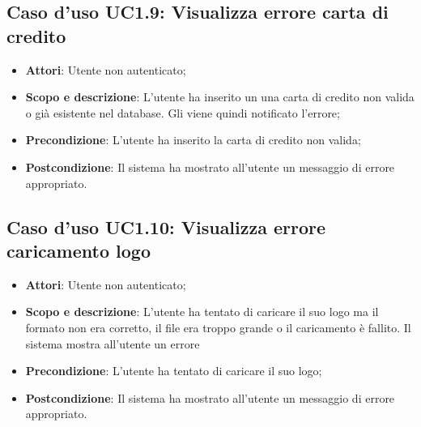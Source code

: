 \documentclass[12pt,a4paper,titlepage]{article}
\begin{document}
	\subsection{Caso d'uso UC1.9: Visualizza errore carta di credito}
	\label{UC1.9}
	\begin{itemize}
		\item \textbf{Attori}: Utente non autenticato;
		\item \textbf{Scopo e descrizione}: L'utente ha inserito un una carta di credito non valida o già esistente nel database. Gli viene quindi notificato l'errore;
		\item \textbf{Precondizione}: L'utente ha inserito la carta di credito non valida;
		\item \textbf{Postcondizione}: Il sistema ha mostrato all'utente un messaggio di errore appropriato.
	\end{itemize}

	\subsection{Caso d'uso UC1.10: Visualizza errore caricamento logo}
	\label{UC1.10}
	\begin{itemize}
		\item \textbf{Attori}: Utente non autenticato;
		\item \textbf{Scopo e descrizione}: L'utente ha tentato di caricare il suo logo ma il formato non era corretto, il file era troppo grande o il caricamento è fallito. Il sistema mostra all'utente un errore
		\item \textbf{Precondizione}: L'utente ha tentato di caricare il suo logo;
		\item \textbf{Postcondizione}: Il sistema ha mostrato all'utente un messaggio di errore appropriato.
	\end{itemize}
\end{document}
